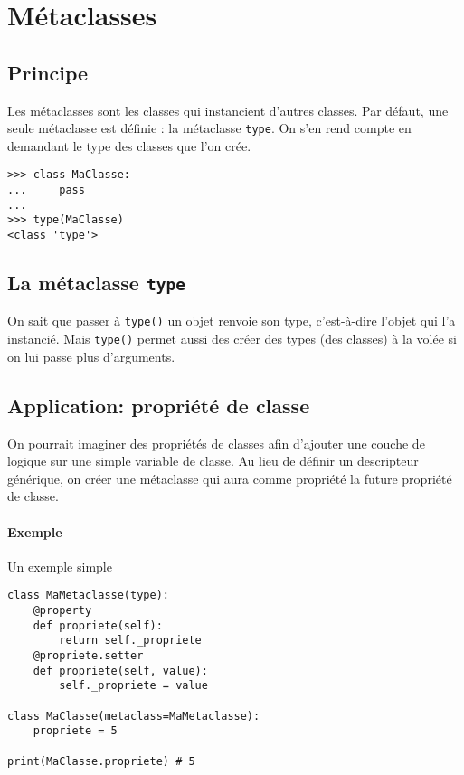 \section{Métaclasses}
\subsection{Principe}
\label{sec:metaclasses}
Les métaclasses sont les classes qui instancient d'autres classes. Par défaut, une seule métaclasse est définie : la métaclasse \texttt{type}. On s'en rend compte en demandant le type des classes que l'on crée.

\begin{verbatim}
>>> class MaClasse:
...     pass
...
>>> type(MaClasse)
<class 'type'>
\end{verbatim}

\subsection[La métaclasse type]{La métaclasse \texttt{type}}

On sait que passer à \texttt{type()} un objet renvoie son type, c'est-à-dire l'objet qui l'a instancié. Mais
\texttt{type()} permet aussi des créer des types (des classes) à la volée si on lui passe plus d'arguments.

\subsection{Application: propriété de classe}
On pourrait imaginer des propriétés de classes afin d'ajouter une couche de logique sur une simple variable de classe. Au lieu de définir un descripteur générique, on créer une métaclasse qui aura comme propriété la future propriété de classe.

\paragraph{Exemple} Un exemple simple
\begin{verbatim}
class MaMetaclasse(type):
    @property
    def propriete(self):
        return self._propriete
    @propriete.setter
    def propriete(self, value):
        self._propriete = value

class MaClasse(metaclass=MaMetaclasse):
    propriete = 5

print(MaClasse.propriete) # 5
\end{verbatim}
